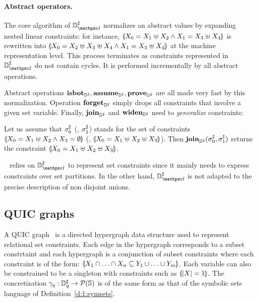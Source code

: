 \paragraph{Abstract operators.}
The core algorithm of \( \adomlin \) normalizes an abstract values by
expanding nested linear constraints:
for instance, \( \llparenthesis X_0 = X_1 \mathrel{\uplus} X_2 \wedge
  X_1 = X_3 \mathrel{\uplus} X_4 \rrparenthesis \) is rewritten into
\( \llparenthesis X_0 = X_2 \mathrel{\uplus} X_3 \mathrel{\uplus} X_4 \wedge
  X_1 = X_3 \mathrel{\uplus} X_4 \rrparenthesis \) at the machine representation
level.
This process terminates as constraints represented in \( \adomlin \)
do not contain cycles.
It is performed incrementally by all abstract operations.

Abstract operations \( \textbf{isbot}_{{\mathbb{D}}^{\sharp}}, \textbf{assume}_{{\mathbb{D}}^{\sharp}}, \textbf{prove}_{{\mathbb{D}}^{\sharp}} \) are all
made very fast by this normalization.
Operation \( \textbf{forget}_{{\mathbb{D}}^{\sharp}} \) simply drops all constraints that involve
a given set variable.
Finally, \( \textbf{join}_{{\mathbb{D}}^{\sharp}} \) and \( \textbf{widen}_{{\mathbb{D}}^{\sharp}} \) need to {\em generalize}
constraints:
\begin{example}
  Let us assume that \( {\sigma}^{\sharp}_0 \) (\resp, \( {\sigma}^{\sharp}_1 \)) stands for
  the set of constraints \( \llparenthesis X_0 = X_1 \mathrel{\uplus} X_2
    \wedge X_3 = \emptyset \rrparenthesis \) (\resp, \( \llparenthesis X_0 = X_1
    \mathrel{\uplus} X_2 \mathrel{\uplus} X_3 \rrparenthesis \)).
  Then \( \textbf{join}_{{\mathbb{D}}^{\sharp}}( {\sigma}^{\sharp}_0, {\sigma}^{\sharp}_1 ) \) returns the constraint
  \( \llparenthesis X_0 = X_1 \mathrel{\uplus} X_2 \mathrel{\uplus} X_3 \rrparenthesis \).
\end{example}
\memcad~\cite{memcad:15:sas} relies on \( \adomlin \) to represent set
constraints since it mainly needs to express constraints over set
partitions.
In the other hand, \( \adomlin \) is not adapted to the precise
description of non disjoint unions.

\subsection{QUIC graphs}
\label{s:4:2:quic}

A QUIC graph~\cite{ab:ecoop:13} is a directed hypergraph data structure used to represent relational set constraints.  Each edge in the hypergraph corresponds to a subset constrtaint and each hypergraph is a conjunction of subset constraints where each constraint is of the form: $\llparenthesis X_1 \cap \ldots \cap X_n \subseteq Y_1 \cup \ldots \cup Y_m \rrparenthesis$.  Each variable can also be constrained to be a singleton with constraints such as $\llparenthesis |X| = 1 \rrparenthesis$.  The concretization $\gamma_q : {\mathbb{D}}^{\sharp}_q \rightarrow \mathcal{P}(\mathbb{S})$ is of the same form as that of the symbolic sets language of Definition~\ref{d:1:symsets}.

